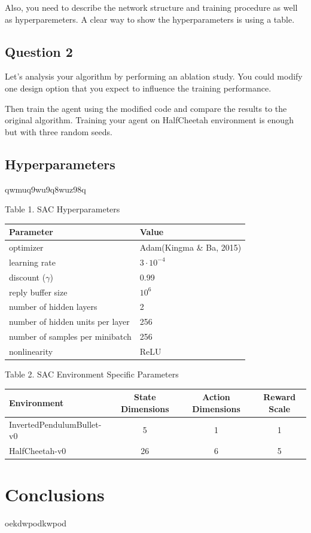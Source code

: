 \documentclass[12pt]{article}
\begin{document}
\pagebreak


\noindent
Also, you need to describe the network structure and training procedure as well
as hyperparemeters. A clear way to show the hyperparameters is using a table.

\subsection*{Question 2}

\noindent
Let’s analysis your algorithm by performing an ablation study. You could modify one design
option that you expect to influence the training performance. 
\newline

\noindent
Then train the agent using the modified code and compare the results to the original algorithm. Training your agent on HalfCheetah environment is enough but with three random seeds.
\newline

\subsection*{Hyperparameters}

qwmuq9wu9q8wuz98q
\newline

Table 1. SAC Hyperparameters
\begin{center}
\begin{tabular}{ l|l } 
 \hline
 Parameter & Value \\ 
 \hline\hline
 optimizer & Adam(Kingma \& Ba, 2015) \\ 
 learning rate & $3\cdot10^{-4}$ \\ 
 discount ($\gamma$) & 0.99 \\
 reply buffer size & $10^6$ \\
 number of hidden layers & 2 \\
 number of hidden units per layer & 256 \\
 number of samples per minibatch & 256 \\
 nonlinearity & ReLU \\
 \hline
\end{tabular}
\end{center}

Table 2. SAC Environment Specific Parameters
\begin{center}
\begin{tabular}{ l c c c } 
 \hline
 Environment & State Dimensions & Action Dimensions & Reward Scale \\ 
 \hline\hline
 InvertedPendulumBullet-v0 & 5 & 1 & 1 \\
 HalfCheetah-v0 & 26 & 6 & 5 \\ 
 \hline
\end{tabular}
\end{center}


\nocite{*}

\pagebreak

\section*{Conclusions}

\noindent
oekdwpodkwpod



\pagebreak




\end{document}
